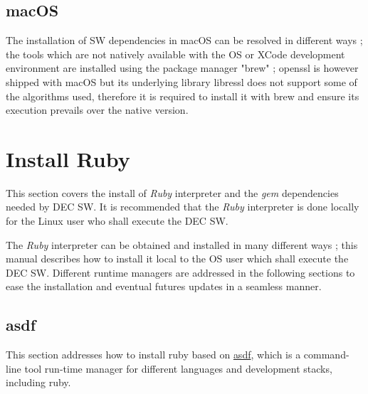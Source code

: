 \documentclass[dec_sum_main.tex]{subfiles}
\begin{document}
 \subsection{macOS}
  The installation of SW dependencies in macOS can be resolved in different ways ; the tools which are not natively available with the OS or XCode development environment are installed using the package manager "brew" ; openssl is however shipped with macOS but its underlying library libressl does not support some of the algorithms used, therefore it is required to install it with brew and ensure its execution prevails over the native version.
 \par
  \noindent
    \newline
    \newline
    \newline
    \newline
 \par
 \noindent
 
 

\section{Install Ruby}
 This section covers the install of \textit{Ruby} interpreter and the \textit{gem} dependencies needed by DEC SW. It is recommended that the \textit{Ruby} interpreter is done locally for the Linux user who shall execute the DEC SW.\newline

\par
\noindent 
The \textit{Ruby} interpreter can be obtained and installed in many different ways ; this manual describes how to install it local to the OS user which shall execute the DEC SW. Different runtime managers are addressed in the following sections to ease the installation and eventual futures updates in a seamless manner.

\subsection{asdf}
\par
\noindent
This section addresses how to install ruby based on \href{https://asdf-vm.com/guide/getting-started.html#_1-install-dependencies}{asdf}, which is a command-line tool run-time manager for different languages and development stacks, including ruby.\newline
\end{document}
